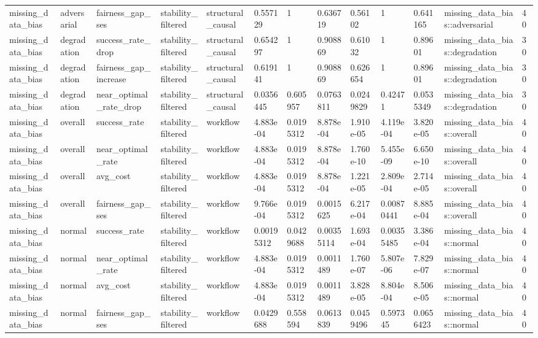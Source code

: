 \begin{tabular}{lllllllllllll}
missing\_data\_bias & adversarial & fairness\_gap\_ses & stability\_filtered & structural\_causal & 0.557129 & 1 & 0.636719 & 0.56102 & 1 & 0.641165 & missing\_data\_bias::adversarial & 40 \\
missing\_data\_bias & degradation & success\_rate\_drop & stability\_filtered & structural\_causal & 0.654297 & 1 & 0.908869 & 0.61032 & 1 & 0.89601 & missing\_data\_bias::degradation & 30 \\
missing\_data\_bias & degradation & fairness\_gap\_increase & stability\_filtered & structural\_causal & 0.619141 & 1 & 0.908869 & 0.626654 & 1 & 0.89601 & missing\_data\_bias::degradation & 30 \\
missing\_data\_bias & degradation & near\_optimal\_rate\_drop & stability\_filtered & structural\_causal & 0.0356445 & 0.605957 & 0.0763811 & 0.0249829 & 0.42471 & 0.0535349 & missing\_data\_bias::degradation & 30 \\
missing\_data\_bias & overall & success\_rate & stability\_filtered & workflow & 4.883e-04 & 0.0195312 & 8.878e-04 & 1.910e-05 & 4.119e-04 & 3.820e-05 & missing\_data\_bias::overall & 40 \\
missing\_data\_bias & overall & near\_optimal\_rate & stability\_filtered & workflow & 4.883e-04 & 0.0195312 & 8.878e-04 & 1.760e-10 & 5.455e-09 & 6.650e-10 & missing\_data\_bias::overall & 40 \\
missing\_data\_bias & overall & avg\_cost & stability\_filtered & workflow & 4.883e-04 & 0.0195312 & 8.878e-04 & 1.221e-05 & 2.809e-04 & 2.714e-05 & missing\_data\_bias::overall & 40 \\
missing\_data\_bias & overall & fairness\_gap\_ses & stability\_filtered & workflow & 9.766e-04 & 0.0195312 & 0.0015625 & 6.217e-04 & 0.00870441 & 8.885e-04 & missing\_data\_bias::overall & 40 \\
missing\_data\_bias & normal & success\_rate & stability\_filtered & workflow & 0.00195312 & 0.0429688 & 0.00355114 & 1.693e-04 & 0.00355485 & 3.386e-04 & missing\_data\_bias::normal & 40 \\
missing\_data\_bias & normal & near\_optimal\_rate & stability\_filtered & workflow & 4.883e-04 & 0.0195312 & 0.0011489 & 1.760e-07 & 5.807e-06 & 7.829e-07 & missing\_data\_bias::normal & 40 \\
missing\_data\_bias & normal & avg\_cost & stability\_filtered & workflow & 4.883e-04 & 0.0195312 & 0.0011489 & 3.828e-05 & 8.804e-04 & 8.506e-05 & missing\_data\_bias::normal & 40 \\
missing\_data\_bias & normal & fairness\_gap\_ses & stability\_filtered & workflow & 0.0429688 & 0.558594 & 0.0613839 & 0.0459496 & 0.597345 & 0.0656423 & missing\_data\_bias::normal & 40 \\

\end{tabular}
